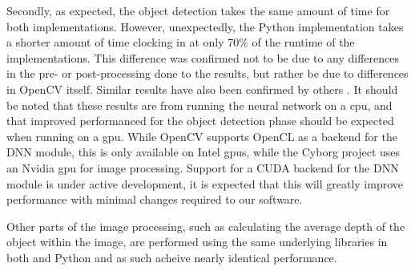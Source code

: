 \documentclass[\rootfolder/main.tex]{subfiles}
\begin{document}
Secondly, as expected, the object detection takes the same amount of time for both \CC implementations.
However, unexpectedly, the Python implementation takes a shorter amount of time clocking in at only 70\% of the runtime of the \CC implementations.
This difference was confirmed not to be due to any differences in the pre- or post-processing done to the results, but rather be due to differences in OpenCV itself.
Similar results have also been confirmed by others \cite{Liu}.
It should be noted that these results are from running the neural network on a \acrshort{cpu}, and that improved performanced for the object detection phase should be expected when running on a \acrfull{gpu}.
While OpenCV supports OpenCL as a backend for the DNN module, this is only available on Intel \acrshort{gpu}s, while the Cyborg project uses an Nvidia \acrshort{gpu} for image processing.
Support for a CUDA backend for the DNN module is under active development, it is expected that this will greatly improve performance with minimal changes required to our software.

Other parts of the image processing, such as calculating the average depth of the object within the image, are performed using the same underlying libraries in both \CC and Python and as such acheive nearly identical performance.
\end{document}
